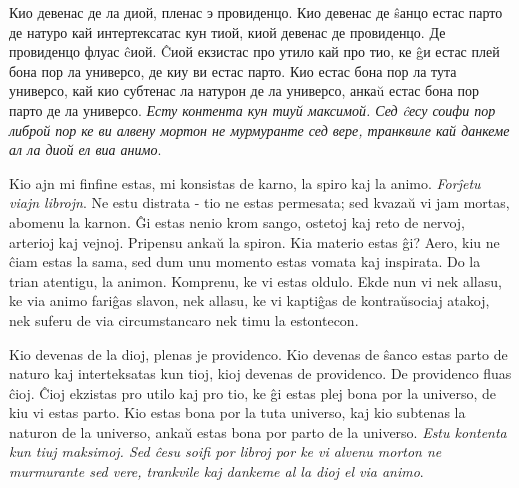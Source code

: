Кио девенас де ла диой, пленас э провиденцо. Кио девенас де ŝанцо естас парто де натуро кай интертексатас кун тиой, киой девенас де провиденцо. Де провиденцо флуас ĉиой. Ĉиой екзистас про утило кай про тио, ке ĝи естас плей бона пор ла универсо, де киу ви естас парто. Кио естас бона пор ла тута универсо, кай кио субтенас ла натурон де ла универсо, анкаŭ естас бона пор парто де ла универсо. \emph{Есту контента кун тиуй максимой. Сед ĉесу соифи пор либрой пор ке ви алвену мортон не мурмуранте сед вере, транквиле кай данкеме ал ла диой ел виа анимо}.

\bye 

Kio ajn mi finfine estas, mi konsistas de karno, la spiro kaj la animo. \emph{Forĵetu viajn librojn}. Ne estu distrata - tio ne estas permesata; sed kvazaŭ vi jam mortas, abomenu la karnon. Ĝi estas nenio krom sango, ostetoj kaj reto de nervoj, arterioj kaj vejnoj. Pripensu ankaŭ la spiron. Kia materio estas ĝi? Aero, kiu ne ĉiam estas la sama, sed dum unu momento estas vomata kaj inspirata. Do la trian atentigu, la animon. Komprenu, ke vi estas oldulo. Ekde nun vi nek allasu, ke via animo fariĝas slavon, nek allasu, ke vi kaptiĝas de kontraŭsociaj atakoj, nek suferu de via circumstancaro nek timu la estontecon.

Kio devenas de la dioj, plenas je providenco. Kio devenas de ŝanco estas parto de naturo kaj interteksatas kun tioj, kioj devenas de providenco. De providenco fluas ĉioj. Ĉioj ekzistas pro utilo kaj pro tio, ke ĝi estas plej bona por la universo, de kiu vi estas parto. Kio estas bona por la tuta universo, kaj kio subtenas la naturon de la universo, ankaŭ estas bona por parto de la universo. \emph{Estu kontenta kun tiuj maksimoj. Sed ĉesu soifi por libroj por ke vi alvenu morton ne murmurante sed vere, trankvile kaj dankeme al la dioj el via animo}.

\bye